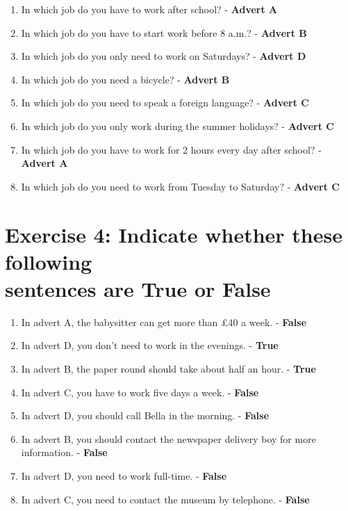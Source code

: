\documentclass[12pt,titlepage]{article}
\begin{document}
\begin{enumerate}
    \item In which job do you have to work after school? - \textbf{Advert A}
    \item In which job do you have to start work before 8 a.m.? - \textbf{Advert B}
    \item In which job do you only need to work on Saturdays? - \textbf{Advert D}
    \item In which job do you need a bicycle? - \textbf{Advert B}
    \item In which job do you need to speak a foreign language? - \textbf{Advert C}
    \item In which job do you only work during the summer holidays? - \textbf{Advert C}
    \item In which job do you have to work for 2 hours every day after school? - \textbf{Advert A}
    \item In which job do you need to work from Tuesday to Saturday? - \textbf{Advert C}
\end{enumerate}

\section{Exercise 4: Indicate whether these following \\ sentences are True or False}

\begin{enumerate}
    \item In advert A, the babysitter can get more than £40 a week. - \textbf{False}
    \item In advert D, you don't need to work in the evenings. - \textbf{True}
    \item In advert B, the paper round should take about half an hour. - \textbf{True}
    \item In advert C, you have to work five days a week. - \textbf{False}
    \item In advert D, you should call Bella in the morning. - \textbf{False}
    \item In advert B, you should contact the newspaper delivery boy for more information. - \textbf{False}
    \item In advert D, you need to work full-time. - \textbf{False}
    \item In advert C, you need to contact the museum by telephone. - \textbf{False}
\end{enumerate}
\end{document}
